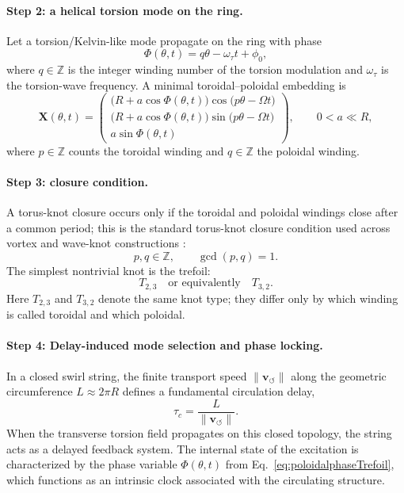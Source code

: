 \documentclass[11pt,a4paper]{article}
\begin{document}
\paragraph{Step 2: a helical torsion mode on the ring.}
Let a torsion/Kelvin-like mode propagate on the ring with phase
\begin{equation}
\Phi(\theta,t)=q\theta-\omega_\tau t+\phi_0,
\label{eq:poloidalphaseTrefoil}
\end{equation}
where \(q\in\mathbb Z\) is the integer winding number of the torsion modulation and \(\omega_\tau\) is the torsion-wave frequency. A minimal toroidal--poloidal embedding is
\begin{equation}
\mathbf{X}(\theta,t)
=
\begin{pmatrix}
\bigl(R+a\cos\Phi(\theta,t)\bigr)\cos\!\bigl(p\theta-\Omega t\bigr)\\[4pt]
\bigl(R+a\cos\Phi(\theta,t)\bigr)\sin\!\bigl(p\theta-\Omega t\bigr)\\[4pt]
a\sin\Phi(\theta,t)
\end{pmatrix},
\qquad 0<a\ll R,
\label{eq:torusknotansatzTrefoil}
\end{equation}
where \(p\in\mathbb Z\) counts the toroidal winding and \(q\in\mathbb Z\) the poloidal winding.

\paragraph{Step 3: closure condition.}
A torus-knot closure occurs only if the toroidal and poloidal windings close after a common period; this is the standard torus-knot closure condition used across vortex and wave-knot constructions \cite{Kedia2013,BerryDennis2001}:
\begin{equation}
p,q\in\mathbb Z,
\qquad
\gcd(p,q)=1.
\label{eq:torusknotclosureTrefoil}
\end{equation}
The simplest nontrivial knot is the trefoil:
\begin{equation}
T_{2,3}\quad\text{or equivalently}\quad T_{3,2}.
\label{eq:trefoiltypesTrefoil}
\end{equation}
Here \(T_{2,3}\) and \(T_{3,2}\) denote the same knot type; they differ only by which winding is called toroidal and which poloidal.

\paragraph{Step 4: Delay-induced mode selection and phase locking.}
In a closed swirl string, the finite transport speed $\lVert \mathbf{v}_{\!\boldsymbol{\circlearrowleft}}\rVert$ along the geometric circumference $L \approx 2\pi R$ defines a fundamental circulation delay,
\begin{equation}
\label{eq:CirculationDelay}
\tau_c = \frac{L}{\lVert \mathbf{v}_{\!\boldsymbol{\circlearrowleft}}\rVert}.
\end{equation}
When the transverse torsion field propagates on this closed topology, the string acts as a delayed feedback system. The internal state of the excitation is characterized by the phase variable $\Phi(\theta,t)$ from Eq.~\eqref{eq:poloidalphaseTrefoil}, which functions as an intrinsic clock associated with the circulating structure.
\end{document}
